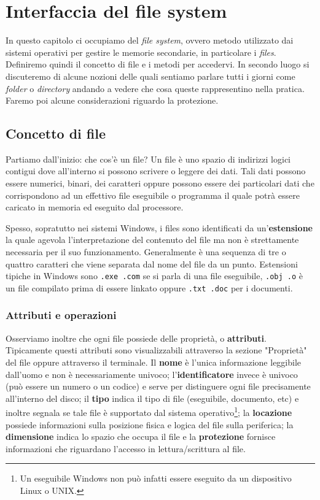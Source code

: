 \pagebreak
\chapter{Interfaccia del file system}\label{file system}
In questo capitolo ci occupiamo del \textit{file system}, ovvero metodo utilizzato dai sistemi operativi per gestire le memorie secondarie, in particolare i \textit{files}. Definiremo quindi il concetto di file e i metodi per accedervi. In secondo luogo si discuteremo di alcune nozioni delle quali sentiamo parlare tutti i giorni come \textit{folder} o \textit{directory} andando a vedere che cosa queste rappresentino nella pratica. Faremo poi alcune considerazioni riguardo la protezione.

\section{Concetto di file}
Partiamo dall'inizio: che cos'è un file? Un file è uno spazio di indirizzi logici contigui dove all'interno si possono scrivere o leggere dei dati. Tali dati possono essere numerici, binari, dei caratteri oppure possono essere dei particolari dati che corrispondono ad un effettivo file eseguibile o programma il quale potrà essere caricato in memoria ed eseguito dal processore.

Spesso, sopratutto nei sistemi Windows, i files sono identificati da un'\textbf{estensione} la quale agevola l'interpretazione del contenuto del file ma non è strettamente necessaria per il suo funzionamento. Generalmente è una sequenza di tre o quattro caratteri che viene separata dal nome del file da un punto. Estensioni tipiche in Windows sono \texttt{.exe .com} se si parla di una file eseguibile, \texttt{.obj .o} è un file compilato prima di essere linkato oppure \texttt{.txt .doc} per i documenti.

\subsection{Attributi e operazioni}\label{operazioni files}
Osserviamo inoltre che ogni file possiede delle proprietà, o \textbf{attributi}. Tipicamente questi attributi sono visualizzabili attraverso la sezione "Proprietà" del file oppure attraverso il terminale. Il \textbf{nome} è l'unica informazione leggibile dall'uomo e non è necessariamente univoco; l'\textbf{identificatore} invece è univoco (può essere un numero o un codice) e serve per distinguere ogni file precisamente all'interno del disco; il \textbf{tipo} indica il tipo di file (eseguibile, documento, etc) e inoltre segnala se tale file è supportato dal sistema operativo\footnote{Un eseguibile Windows non può infatti essere eseguito da un dispositivo Linux o UNIX.}; la \textbf{locazione} possiede informazioni sulla posizione fisica e logica del file sulla periferica; la \textbf{dimensione} indica lo spazio che occupa il file e la \textbf{protezione} fornisce informazioni che riguardano l'accesso in lettura/scrittura al file.

